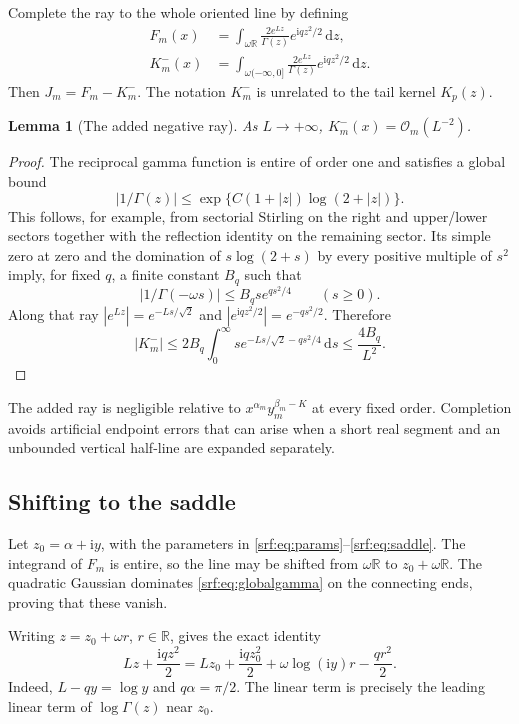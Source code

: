 \documentclass[11pt]{article}
\newtheorem{lemma}[theorem]{Lemma}
\theoremstyle{remark}\newtheorem{remark}[theorem]{Remark}
\newcommand{\OO}{\mathcal O}
\newcommand{\R}{\mathbb R}
\newcommand{\ii}{\mathrm i}
\newcommand{\dd}{\,\mathrm d}
\begin{document}
Complete the ray to the whole oriented line by defining
\begin{align}
 F_m(x)&=\int_{\omega\R}\frac{2e^{Lz}}{\Gamma(z)}e^{\ii qz^2/2}\dd z,\label{srf:eq:F}\\
 K_m^-(x)&=\int_{\omega(-\infty,0]}\frac{2e^{Lz}}{\Gamma(z)}e^{\ii qz^2/2}\dd z.
\end{align}
Then $J_m=F_m-K_m^-$. The notation $K_m^-$ is unrelated to the tail kernel $K_p(z)$.

\begin{lemma}[The added negative ray]\label{srf:lem:negative}
As $L\to+\infty$, $K_m^-(x)=\OO_m(L^{-2})$.
\end{lemma}
\begin{proof}
The reciprocal gamma function is entire of order one and satisfies a global bound
\begin{equation}\label{srf:eq:globalgamma}
 |1/\Gamma(z)|\le\exp\{C(1+|z|)\log(2+|z|)\}.
\end{equation}
This follows, for example, from sectorial Stirling on the right and upper/lower sectors together with the reflection identity on the remaining sector. Its simple zero at zero and the domination of $s\log(2+s)$ by every positive multiple of $s^2$ imply, for fixed $q$, a finite constant $B_q$ such that
\[
 |1/\Gamma(-\omega s)|\le B_qs e^{qs^2/4}\qquad(s\ge0).
\]
Along that ray $|e^{Lz}|=e^{-Ls/\sqrt2}$ and
$|e^{\ii qz^2/2}|=e^{-qs^2/2}$. Therefore
\[
 |K_m^-|\le2B_q\int_0^\infty
       s e^{-Ls/\sqrt2-qs^2/4}\dd s
       \le\frac{4B_q}{L^2}.
\]
\end{proof}
The added ray is negligible relative to $x^{\alpha_m}y_m^{\beta_m-K}$ at every fixed order. Completion avoids artificial endpoint errors that can arise when a short real segment and an unbounded vertical half-line are expanded separately.

\subsection{Shifting to the saddle}
Let $z_0=\alpha+\ii y$, with the parameters in \eqref{srf:eq:params}--\eqref{srf:eq:saddle}. The integrand of $F_m$ is entire, so the line may be shifted from $\omega\R$ to $z_0+\omega\R$. The quadratic Gaussian dominates \eqref{srf:eq:globalgamma} on the connecting ends, proving that these vanish.

Writing $z=z_0+\omega r$, $r\in\R$, gives the exact identity
\begin{equation}\label{srf:eq:cancellation}
 Lz+\frac{\ii qz^2}{2}
 =Lz_0+\frac{\ii qz_0^2}{2}
        +\omega\log(\ii y)r-\frac{qr^2}{2}.
\end{equation}
Indeed, $L-qy=\log y$ and $q\alpha=\pi/2$. The linear term is precisely the leading linear term of $\log\Gamma(z)$ near $z_0$.
\end{document}
